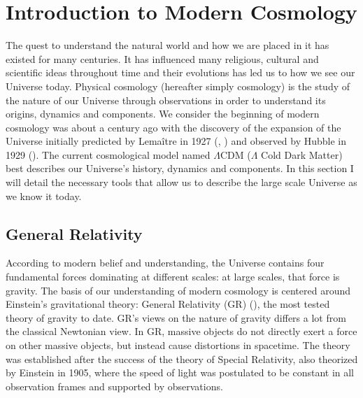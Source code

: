 \section{Introduction to Modern Cosmology}

The quest to understand the natural world and how we are placed in it has existed for many centuries. It has influenced many religious, cultural and scientific 
ideas throughout time and their evolutions has led us to how we see our Universe today.
Physical cosmology (hereafter simply cosmology) is the study of the nature of our Universe through observations in order to understand its origins, dynamics and components. 
We consider the beginning of modern cosmology was about a century ago with the discovery of the expansion of the Universe initially predicted by Lemaître in 1927 (\cite{Lemaitre_1927},  \cite{Lemaitre_1931})
and observed by Hubble in 1929 (\cite{Hubble_1929}). The current cosmological model named $\Lambda$CDM ($\Lambda$ Cold Dark Matter) best describes our Universe's 
history, dynamics and components. In this section I will detail the necessary tools that allow us to describe the large scale Universe 
as we know it today. \\

\subsection{General Relativity}

According to modern belief and understanding, the Universe contains four fundamental forces dominating at different scales: at large scales, that force is gravity.
The basis of our understanding of modern cosmology is centered around Einstein's gravitational theory: General Relativity (GR) (\cite{Einstein_1916}), the most tested theory of
gravity to date. GR's views on the nature of gravity differs a lot from the classical Newtonian view. In GR, massive objects do not directly exert a force on other massive objects, but instead 
cause distortions in spacetime. The theory was established after the success of the theory of Special Relativity, also theorized by Einstein in 1905, where the speed of 
light was postulated to be constant in all observation frames and supported by observations.\\

